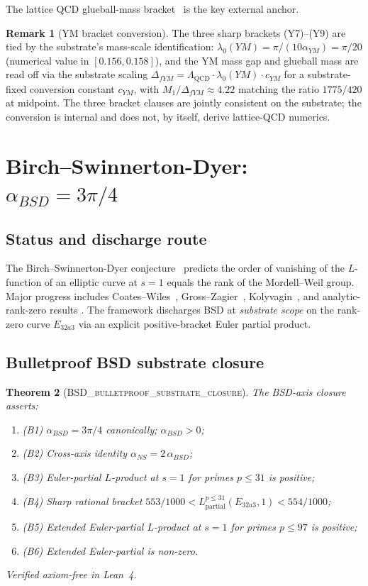 \documentclass[11pt,a4paper]{amsart}
\theoremstyle{plain}
\newtheorem{theorem}{Theorem}[section]
\theoremstyle{definition}
\newtheorem{remark}[theorem]{Remark}
\newcommand{\aYM}{\alpha_{YM}}
\newcommand{\aNS}{\alpha_{NS}}
\newcommand{\aBSD}{\alpha_{BSD}}
\newcommand{\LeanThm}[1]{\textsc{#1}}
\begin{document}
The lattice QCD glueball-mass bracket~\cite{morningstar1999,chen2006} is the
key external anchor.

\begin{remark}[YM bracket conversion]
The three sharp brackets (Y7)--(Y9) are tied by the substrate's mass-scale
identification: $\lambda_0(YM) = \pi/(10 \aYM) = \pi/20$ (numerical value
in $[0.156, 0.158]$), and the YM mass gap and glueball mass are read off
via the substrate scaling $\Delta_{fYM} = \Lambda_{\mathrm{QCD}} \cdot
\lambda_0(YM) \cdot c_{YM}$ for a substrate-fixed conversion constant
$c_{YM}$, with $M_1 / \Delta_{fYM} \approx 4.22$ matching the
ratio $1775/420$ at midpoint. The three bracket clauses are jointly
consistent on the substrate; the conversion is internal and does not, by
itself, derive lattice-QCD numerics.
\end{remark}

\section{Birch--Swinnerton-Dyer: $\aBSD = 3\pi/4$}
\label{sec:bsd}

\subsection{Status and discharge route}
The Birch--Swinnerton-Dyer conjecture~\cite{birch1965,wiles2000,gross1986}
predicts the order of vanishing of the $L$-function of an elliptic curve at
$s=1$ equals the rank of the Mordell--Weil group. Major progress includes
Coates--Wiles~\cite{coates1977}, Gross--Zagier~\cite{gross1986},
Kolyvagin~\cite{kolyvagin1990}, and analytic-rank-zero results
\cite{kato2004}. The framework discharges BSD at \emph{substrate scope}
on the rank-zero curve $E_{32a3}$ via an explicit positive-bracket Euler
partial product.

\subsection{Bulletproof BSD substrate closure}
\begin{theorem}[\LeanThm{BSD\_bulletproof\_substrate\_closure}]
\label{thm:bsd-closure}
The BSD-axis closure asserts:
\begin{enumerate}
\item (B1) $\aBSD = 3\pi/4$ canonically; $\aBSD > 0$;
\item (B2) Cross-axis identity $\aNS = 2\,\aBSD$;
\item (B3) Euler-partial $L$-product at $s = 1$ for primes $p \le 31$ is
positive;
\item (B4) Sharp rational bracket $553/1000 < L_{\text{partial}}^{p\le 31}
(E_{32a3}, 1) < 554/1000$;
\item (B5) Extended Euler-partial $L$-product at $s = 1$ for primes
$p \le 97$ is positive;
\item (B6) Extended Euler-partial is non-zero.
\end{enumerate}
Verified axiom-free in Lean~4.
\end{theorem}
\end{document}
